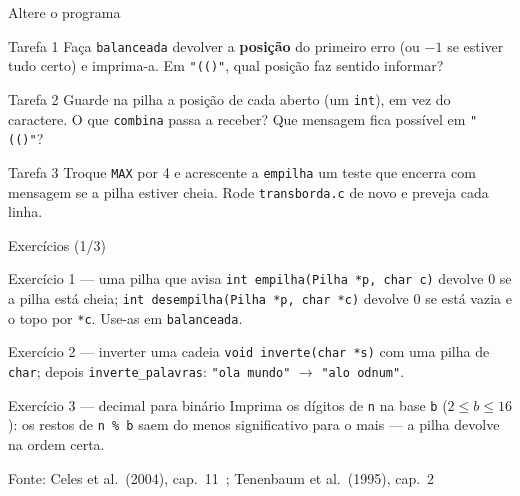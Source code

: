 \documentclass[aspectratio=169]{beamer}
\newcommand{\fonte}[1]{\vfill\hfill{\scriptsize\textcolor{UFSGray}{Fonte: #1}}}
\begin{document}
\begin{frame}{Altere o programa}
  \small
  \begin{block}{Tarefa 1}
    Faça \texttt{balanceada} devolver a \textbf{posição} do primeiro erro (ou
    $-1$ se estiver tudo certo) e imprima-a. Em \texttt{"(()"}, qual posição
    faz sentido informar?
  \end{block}
  \begin{block}{Tarefa 2}
    Guarde na pilha a posição de cada aberto (um \texttt{int}), em vez do
    caractere. O que \texttt{combina} passa a receber? Que mensagem fica
    possível em \texttt{"(()"}?
  \end{block}
  \begin{block}{Tarefa 3}
    Troque \texttt{MAX} por 4 e acrescente a \texttt{empilha} um teste que
    encerra com mensagem se a pilha estiver cheia. Rode
    \texttt{transborda.c} de novo e preveja cada linha.
  \end{block}
\end{frame}

\begin{frame}{Exercícios (1/3)}
  \footnotesize
  \begin{block}{Exercício 1 --- uma pilha que avisa}
    \texttt{int empilha(Pilha *p, char c)} devolve 0 se a pilha está cheia;
    \texttt{int desempilha(Pilha *p, char *c)} devolve 0 se está vazia e o
    topo por \texttt{*c}. Use-as em \texttt{balanceada}.
  \end{block}
  \begin{block}{Exercício 2 --- inverter uma cadeia}
    \texttt{void inverte(char *s)} com uma pilha de \texttt{char}; depois
    \texttt{inverte\_palavras}: \texttt{"ola mundo"} $\to$ \texttt{"alo odnum"}.
  \end{block}
  \begin{block}{Exercício 3 --- decimal para binário}
    Imprima os dígitos de \texttt{n} na base \texttt{b} ($2 \le b \le 16$):
    os restos de \texttt{n \% b} saem do menos significativo para o mais ---
    a pilha devolve na ordem certa.
  \end{block}
  \fonte{Celes et al.\ (2004), cap.~11~\cite{celes2004introducao};
    Tenenbaum et al.\ (1995), cap.~2~\cite{tenenbaum1995estruturas}}
\end{frame}
\end{document}
